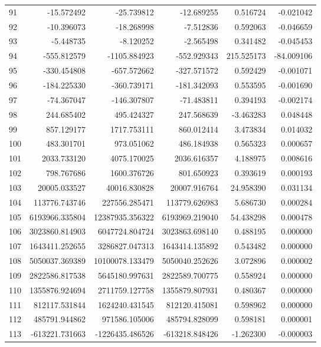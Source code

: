 \begin{tabular}{lrrrrr}
91 & -15.572492 & -25.739812 & -12.689255 & 0.516724 & -0.021042 \\
92 & -10.396073 & -18.268998 & -7.512836 & 0.592063 & -0.046659 \\
93 & -5.448735 & -8.120252 & -2.565498 & 0.341482 & -0.045453 \\
94 & -555.812579 & -1105.884923 & -552.929343 & 215.525173 & -84.009106 \\
95 & -330.454808 & -657.572662 & -327.571572 & 0.592429 & -0.001071 \\
96 & -184.225330 & -360.739171 & -181.342093 & 0.553595 & -0.001690 \\
97 & -74.367047 & -146.307807 & -71.483811 & 0.394193 & -0.002174 \\
98 & 244.685402 & 495.424327 & 247.568639 & -3.463283 & 0.048448 \\
99 & 857.129177 & 1717.753111 & 860.012414 & 3.473834 & 0.014032 \\
100 & 483.301701 & 973.051062 & 486.184938 & 0.565323 & 0.000657 \\
101 & 2033.733120 & 4075.170025 & 2036.616357 & 4.188975 & 0.008616 \\
102 & 798.767686 & 1600.376726 & 801.650923 & 0.393619 & 0.000193 \\
103 & 20005.033527 & 40016.830828 & 20007.916764 & 24.958390 & 0.031134 \\
104 & 113776.743746 & 227556.285471 & 113779.626983 & 5.686730 & 0.000284 \\
105 & 6193966.335804 & 12387935.356322 & 6193969.219040 & 54.438298 & 0.000478 \\
106 & 3023860.814903 & 6047724.804724 & 3023863.698140 & 0.488195 & 0.000000 \\
107 & 1643411.252655 & 3286827.047313 & 1643414.135892 & 0.543482 & 0.000000 \\
108 & 5050037.369389 & 10100078.133479 & 5050040.252626 & 3.072896 & 0.000002 \\
109 & 2822586.817538 & 5645180.997631 & 2822589.700775 & 0.558924 & 0.000000 \\
110 & 1355876.924694 & 2711759.127758 & 1355879.807931 & 0.480367 & 0.000000 \\
111 & 812117.531844 & 1624240.431545 & 812120.415081 & 0.598962 & 0.000000 \\
112 & 485791.944862 & 971586.105006 & 485794.828099 & 0.598181 & 0.000001 \\
113 & -613221.731663 & -1226435.486526 & -613218.848426 & -1.262300 & -0.000003 \\

\end{tabular}
